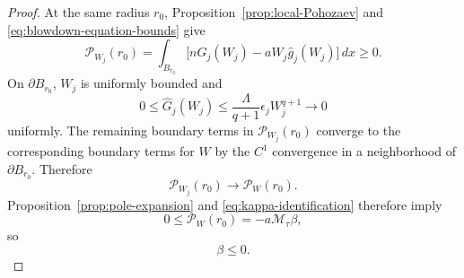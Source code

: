 \documentclass[reqno,12pt]{amsart}
\numberwithin{equation}{section}
\theoremstyle{remark}
\newcommand{\dd}{\,d}
\newcommand{\Pscr}{\mathscr P}
\begin{document}
\begin{proof}
\medskip
{}
At the same radius $r_0$, Proposition~\ref{prop:local-Pohozaev} and
\eqref{eq:blowdown-equation-bounds} give
$$
\Pscr_{W_j}(r_0)=\int_{B_{r_0}}  \bigl[n\widehat G_j(W_j)
-aW_j\widehat g_j(W_j)\bigr]\dd x \ge0.
$$
On $\partial B_{r_0}$, $W_j$ is uniformly bounded and
$$
0\le\widehat G_j(W_j)
\le\frac{\Lambda}{q+1}\epsilon_jW_j^{q+1}
\to 0
$$
uniformly.  The remaining boundary terms in $\Pscr_{W_j}(r_0)$ converge to the corresponding boundary terms for $W$ by the $C^1$ convergence in a neighborhood of $\partial B_{r_0}$.  Therefore
$$
\Pscr_{W_j}(r_0)\to\Pscr_W(r_0).
$$
Proposition~\ref{prop:pole-expansion} and \eqref{eq:kappa-identification} therefore imply
$$
0\le\Pscr_W(r_0)
=-a\mathcal M_\tau\beta,
$$
so
\begin{equation}\label{eq:beta-nonpositive}
\beta\le0.
\end{equation}


\end{proof}
\end{document}
